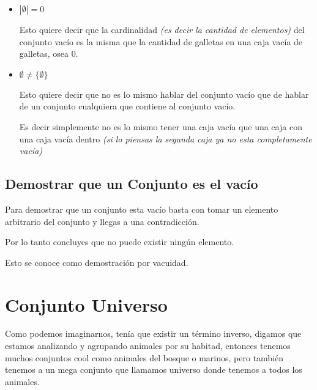 \documentclass[12pt, fleqn]{report}                             %
\begin{document}
                \begin{itemize}
                    \item $|\emptyset| = 0$

                            Esto quiere decir que la cardinalidad \emph{(es decir
                            la cantidad de elementos)} del conjunto vacío es la misma que 
                            la cantidad de galletas en una caja vacía de galletas, osea 0.

                    \item $\emptyset \neq \{\emptyset\}$

                            Esto quiere decir que no es lo mismo hablar del conjunto
                            vacío que de hablar de un conjunto cualquiera que contiene al
                            conjunto vacío.

                            Es decir simplemente no es lo mismo tener una caja vacía que una caja
                            con una caja vacía dentro \emph{(si lo piensas la segunda caja ya 
                            no esta completamente vacía)}
                \end{itemize}


            \subsection{Demostrar que un Conjunto es el vacío}

                Para demostrar que un conjunto esta vacío basta con tomar
                un elemento arbitrario del conjunto y llegas a una contradicción.

                Por lo tanto concluyes que no puede existir ningún elemento.

                Esto se conoce como demostración por vacuidad.


        \clearpage
        \section{Conjunto Universo}
            
            Como podemos imaginarnos, tenía que existir un término inverso, digamos que estamos
            analizando y agrupando animales por su habitad, entonces tenemos muchos conjuntos cool
            como animales del bosque o marinos, pero también tenemos a un mega conjunto que llamamos
            universo donde tenemos a todos los animales.
\end{document}
